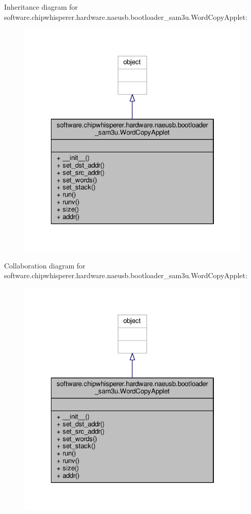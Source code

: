 Inheritance diagram for software.\+chipwhisperer.\+hardware.\+naeusb.\+bootloader\+\_\+sam3u.\+Word\+Copy\+Applet\+:\nopagebreak
\begin{figure}[H]
\begin{center}
\leavevmode
\includegraphics[width=322pt]{d3/d3c/classsoftware_1_1chipwhisperer_1_1hardware_1_1naeusb_1_1bootloader__sam3u_1_1WordCopyApplet__inherit__graph}
\end{center}
\end{figure}


Collaboration diagram for software.\+chipwhisperer.\+hardware.\+naeusb.\+bootloader\+\_\+sam3u.\+Word\+Copy\+Applet\+:\nopagebreak
\begin{figure}[H]
\begin{center}
\leavevmode
\includegraphics[width=322pt]{d9/d4e/classsoftware_1_1chipwhisperer_1_1hardware_1_1naeusb_1_1bootloader__sam3u_1_1WordCopyApplet__coll__graph}
\end{center}
\end{figure}


